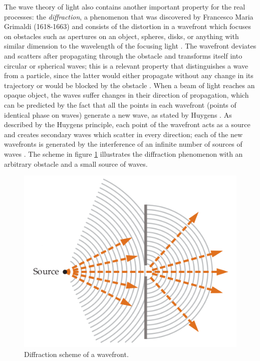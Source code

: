 The wave theory of light also contains another important property for the real processes: the \emph{diffraction}, a phenomenon that was discovered by Francesco Maria Grimaldi (1618-1663) and consists of the distortion in a wavefront which focuses on obstacles such as apertures on an object, spheres, disks, or anything with similar dimension to the wavelength of the focusing light \cite{zilio2009optica}. The wavefront deviates and scatters after propagating through the obstacle and transforms itself into circular or spherical waves; this is a relevant property that distinguishes a wave from a particle, since the latter would either propagate without any change in its trajectory or would be blocked by the obstacle \cite{tipler2007physics}. When a beam of light reaches an opaque object, the waves suffer changes in their direction of propagation, which can be predicted by the fact that all the points in each wavefront (points of identical phase on waves) generate a new wave, as stated by Huygens \cite{fowles1989introduction}. As described by the Huygens principle, each point of the wavefront acts as a source and creates secondary waves which scatter in every direction; each of the new wavefronts is generated by the interference of an infinite number of sources of waves \cite{zilio2009optica}. The scheme in figure \ref{fig:diffraction} illustrates the diffraction phenomenon with an arbitrary obstacle and a small source of waves.

\begin{figure}[htb]
	\centering
	\caption{\label{fig:diffraction} Diffraction scheme of a wavefront.}
	\begin{center}
	    \includegraphics[scale=0.5]{images/diffraction.png}
	\end{center}
	\centering
\end{figure}

